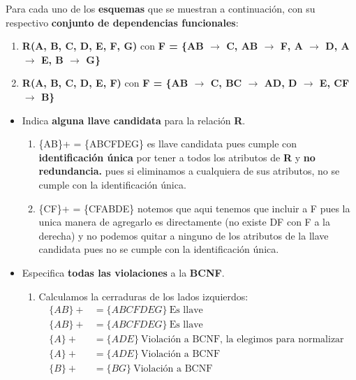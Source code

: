 Para cada uno de los \textbf{esquemas} que se muestran a continuación, con su respectivo \textbf{conjunto de dependencias funcionales}:

\begin{enumerate}[label=\alph*.]
    \item \textbf{R(A, B, C, D, E, F, G)} con \textbf{F = \{AB $\rightarrow$ C, AB $\rightarrow$ F, A $\rightarrow$ D, A $\rightarrow$ E, B $\rightarrow$ G\}}
    \item \textbf{R(A, B, C, D, E, F)} con \textbf{F = \{AB $\rightarrow$ C, BC $\rightarrow$ AD, D $\rightarrow$ E, CF $\rightarrow$ B\}}
\end{enumerate}

\begin{itemize}
    \item Indica \textbf{alguna llave candidata} para la relación \textbf{R}. \vspace{.3cm}

    \begin{enumerate}[label=\alph*.]
        \item \{AB\}+ = \{ABCFDEG\} es llave candidata pues cumple con \textbf{identificación única} por tener a todos los atributos de \textbf{R} y \textbf{no redundancia.} pues si eliminamos a cualquiera de sus atributos, no se cumple con la identificación única.  \vspace{.2cm}
        
        \item \{CF\}+ = \{CFABDE\} notemos que aqui tenemos que incluir a F pues la unica manera de agregarlo es directamente (no existe DF con F a la derecha) y no podemos quitar a ninguno de los atributos de la llave candidata pues no se cumple con la identificación única. \vspace{.2cm}
    \end{enumerate}
    \vspace{.3cm}

    \item Especifica \textbf{todas las violaciones} a la \textbf{BCNF}. \vspace{.3cm}
    
    \begin{enumerate}[label=\alph*.]
        \item 
        Calculamos la cerraduras de los lados izquierdos:
        \begin{align*}
            \{AB\}+ &= \{ABCFDEG\} \ \text{Es llave} \\
            \{AB\}+ &= \{ABCFDEG\} \ \text{Es llave} \\
            \{A\}+ &= \{ADE\} \ \text{Violación a BCNF, la elegimos para normalizar } \\
            \{A\}+ &= \{ADE\} \ \text{Violación a BCNF} \\
            \{B\}+ &= \{BG\} \ \text{Violación a BCNF} 
        \end{align*}


\end{enumerate}
\end{itemize}
